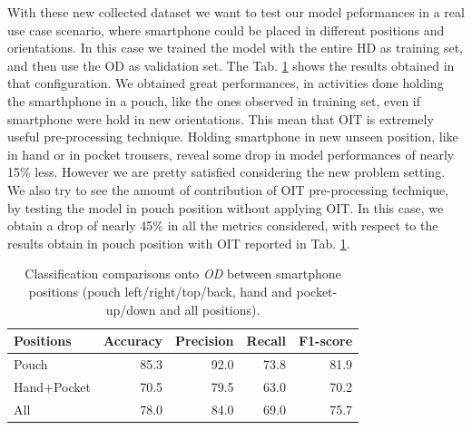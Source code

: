With these new collected dataset we want to test our model peformances in a real use case scenario, where smartphone could be placed in different positions and orientations. In this case we trained the model with the entire HD as training set, and then use the OD as validation set. The Tab. \ref{tab:model-oit-performance} shows the results obtained in that configuration. We obtained great performances, in activities done holding the smarthphone in a pouch, like the ones observed in training set, even if smartphone were hold in new orientations. This mean that OIT is extremely useful pre-processing technique.
Holding smartphone in new unseen position, like in hand or in pocket trousers, reveal some drop in model performances of nearly 15\% less. However we are pretty satisfied considering the new problem setting.
We also try to see the amount of contribution of OIT pre-processing technique, by testing the model in pouch position without applying OIT. In this case, we obtain a drop of nearly 45\% in all the metrics considered, with respect to the results obtain in pouch position with OIT reported in Tab. \ref{tab:model-oit-performance}.

\begin{table}[ht]
  \begin{center}
    \begin{tabular}{p{1.8cm}rrrr}
      \hline
      Positions & Accuracy & Precision & Recall & F1-score \\
      \hline
      Pouch & 85.3 & 92.0 & 73.8 & 81.9 \\
      Hand+Pocket & 70.5 & 79.5 & 63.0 & 70.2 \\
      All & 78.0 & 84.0 & 69.0 & 75.7 \\
      \hline
    \end{tabular}
    \caption{Classification comparisons onto \textit{OD} between
      smartphone positions (pouch left/right/top/back, hand and
      pocket-up/down and all positions).}
    \label{tab:model-oit-performance}
  \end{center}
\end{table}


